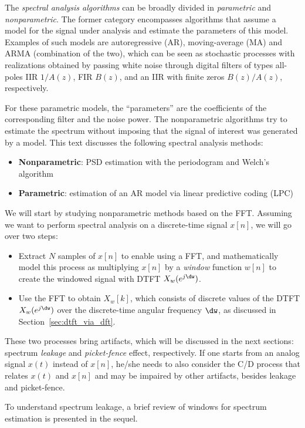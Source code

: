 The \emph{spectral analysis algorithms} can be broadly divided in \emph{parametric} and \emph{nonparametric}. The former category encompasses algorithms that assume a model for the signal under analysis and estimate the parameters of this model. Examples of such models are autoregressive (AR), moving-average (MA) and ARMA (combination of the two), which can be seen as stochastic processes with realizations obtained by passing white noise through digital filters of types all-poles IIR $1/A(z)$, FIR $B(z)$, and an IIR with finite zeros $B(z)/A(z)$,
respectively. 

For these parametric models, the ``parameters'' are the coefficients of the corresponding filter and the noise power. The nonparametric algorithms try to estimate the spectrum without imposing that the signal of interest was generated by a model. 
This text discusses the following spectral analysis methods:
\begin{itemize}
\item \textbf{Nonparametric}: PSD estimation with the periodogram and Welch's algorithm
\item \textbf{Parametric}: estimation of an AR model via linear predictive coding (LPC)
\end{itemize}

We will start by studying nonparametric methods based on the FFT. Assuming we want to perform
spectral analysis on a discrete-time signal $x[n]$, we will go over two steps:
\begin{itemize}
\item Extract $N$ samples of $x[n]$ to enable using a FFT, and mathematically model this process as multiplying
$x[n]$ by a \emph{window} function $w[n]$ to create the windowed signal with DTFT $X_w(e^{j \dw})$.
\item Use the FFT to obtain $X_w[k]$, which consists of discrete values of the DTFT $X_w(e^{j \dw})$ over the discrete-time angular frequency $\dw$, as discussed in Section~\ref{sec:dtft_via_dft}.
\end{itemize}
These two processes bring artifacts, which will be discussed in the next sections: spectrum \emph{leakage} and \emph{picket-fence} effect, respectively. If one starts from an analog signal $x(t)$ instead of $x[n]$, he/she needs to also consider the C/D process that relates $x(t)$ and $x[n]$ and may be impaired by other artifacts, besides leakage and picket-fence.

To understand spectrum leakage, a brief review of windows for spectrum estimation is presented in the sequel.

